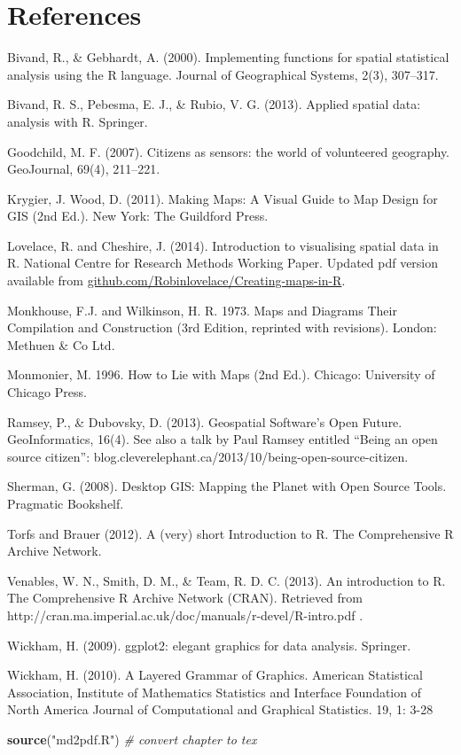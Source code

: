 \documentclass[]{article}
\newenvironment{Shaded}{}{}
\newcommand{\KeywordTok}[1]{\textcolor[rgb]{0.00,0.44,0.13}{\textbf{{#1}}}}
\newcommand{\StringTok}[1]{\textcolor[rgb]{0.25,0.44,0.63}{{#1}}}
\newcommand{\CommentTok}[1]{\textcolor[rgb]{0.38,0.63,0.69}{\textit{{#1}}}}
\newcommand{\NormalTok}[1]{{#1}}
\begin{document}
\section{References}

Bivand, R., \& Gebhardt, A. (2000). Implementing functions for spatial
statistical analysis using the R language. Journal of Geographical
Systems, 2(3), 307--317.

Bivand, R. S., Pebesma, E. J., \& Rubio, V. G. (2013). Applied spatial
data: analysis with R. Springer.

Goodchild, M. F. (2007). Citizens as sensors: the world of volunteered
geography. GeoJournal, 69(4), 211--221.

Krygier, J. Wood, D. (2011). Making Maps: A Visual Guide to Map Design
for GIS (2nd Ed.). New York: The Guildford Press.

Lovelace, R. and Cheshire, J. (2014). Introduction to visualising
spatial data in R. National Centre for Research Methods Working Paper.
Updated pdf version available from
\href{https://github.com/Robinlovelace/Creating-maps-in-R}{github.com/Robinlovelace/Creating-maps-in-R}.

Monkhouse, F.J. and Wilkinson, H. R. 1973. Maps and Diagrams Their
Compilation and Construction (3rd Edition, reprinted with revisions).
London: Methuen \& Co Ltd.

Monmonier, M. 1996. How to Lie with Maps (2nd Ed.). Chicago: University
of Chicago Press.

Ramsey, P., \& Dubovsky, D. (2013). Geospatial Software's Open Future.
GeoInformatics, 16(4). See also a talk by Paul Ramsey entitled ``Being
an open source citizen'':
blog.cleverelephant.ca/2013/10/being-open-source-citizen.

Sherman, G. (2008). Desktop GIS: Mapping the Planet with Open Source
Tools. Pragmatic Bookshelf.

Torfs and Brauer (2012). A (very) short Introduction to R. The
Comprehensive R Archive Network.

Venables, W. N., Smith, D. M., \& Team, R. D. C. (2013). An introduction
to R. The Comprehensive R Archive Network (CRAN). Retrieved from
http://cran.ma.imperial.ac.uk/doc/manuals/r-devel/R-intro.pdf .

Wickham, H. (2009). ggplot2: elegant graphics for data analysis.
Springer.

Wickham, H. (2010). A Layered Grammar of Graphics. American Statistical
Association, Institute of Mathematics Statistics and Interface
Foundation of North America Journal of Computational and Graphical
Statistics. 19, 1: 3-28

\begin{Shaded}
\begin{Highlighting}[]
\KeywordTok{source}\NormalTok{(}\StringTok{"md2pdf.R"}\NormalTok{)  }\CommentTok{# convert chapter to tex}
\end{Highlighting}
\end{Shaded}
\end{document}
